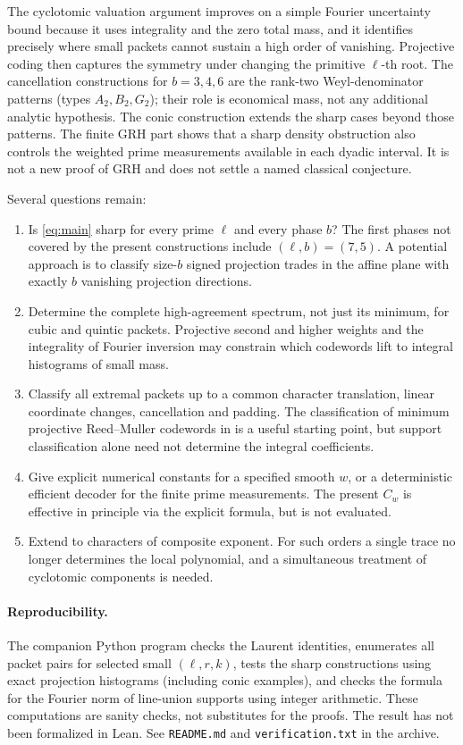 \documentclass[11pt]{article}
\theoremstyle{remark}\newtheorem{remark}[theorem]{Remark}
\begin{document}
The cyclotomic valuation argument improves on a simple Fourier uncertainty bound because it uses integrality and the zero total mass, and it identifies precisely where small packets cannot sustain a high order of vanishing. Projective coding then captures the symmetry under changing the primitive $\ell$-th root. The cancellation constructions for $b=3,4,6$ are the rank-two Weyl-denominator patterns (types $A_2,B_2,G_2$); their role is economical mass, not any additional analytic hypothesis. The conic construction extends the sharp cases beyond those patterns. The finite GRH part shows that a sharp density obstruction also controls the weighted prime measurements available in each dyadic interval. It is not a new proof of GRH and does not settle a named classical conjecture.

Several questions remain:
\begin{enumerate}
\item Is \eqref{eq:main} sharp for every prime $\ell$ and every phase $b$? The first phases not covered by the present constructions include $(\ell,b)=(7,5)$. A potential approach is to classify size-$b$ signed projection trades in the affine plane with exactly $b$ vanishing projection directions.
\item Determine the complete high-agreement spectrum, not just its minimum, for cubic and quintic packets. Projective second and higher weights and the integrality of Fourier inversion may constrain which codewords lift to integral histograms of small mass.
\item Classify all extremal packets up to a common character translation, linear coordinate changes, cancellation and padding. The classification of minimum projective Reed--Muller codewords in \cite{ghorpade} is a useful starting point, but support classification alone need not determine the integral coefficients.
\item Give explicit numerical constants for a specified smooth $w$, or a deterministic efficient decoder for the finite prime measurements. The present $C_w$ is effective in principle via the explicit formula, but is not evaluated.
\item Extend to characters of composite exponent. For such orders a single trace no longer determines the local polynomial, and a simultaneous treatment of cyclotomic components is needed.
\end{enumerate}

\paragraph{Reproducibility.} The companion Python program checks the Laurent identities, enumerates all packet pairs for selected small $(\ell,r,k)$, tests the sharp constructions using exact projection histograms (including conic examples), and checks the formula for the Fourier norm of line-union supports using integer arithmetic. These computations are sanity checks, not substitutes for the proofs. The result has not been formalized in Lean. See \texttt{README.md} and \texttt{verification.txt} in the archive.
\end{document}
